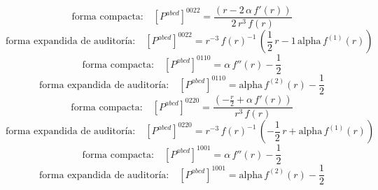 \documentclass[11pt]{article}
\begin{document}
\begin{dmath*}[breakdepth={5}]
\text{forma compacta:}\quad \left[P^{abcd}\right]^{0022} = \frac{\left(r - 2\,\alpha\,f'\!\left(r\right)\right)}{2\,{r}^{3}\,f\!\left(r\right)}
\end{dmath*}
\begin{dmath*}[breakdepth={5}]
\text{forma expandida de auditoría:}\quad \left[P^{abcd}\right]^{0022} = {r}^{-3}\,{f\!\left(r\right)}^{-1}\,\left(\frac{1}{2}\,r - 1\,\mathrm{alpha}\,f^{(1)}\!\left(r\right)\right)
\end{dmath*}
\begin{dmath*}[breakdepth={5}]
\text{forma compacta:}\quad \left[P^{abcd}\right]^{0110} = \alpha\,f''\!\left(r\right) - \frac{1}{2}
\end{dmath*}
\begin{dmath*}[breakdepth={5}]
\text{forma expandida de auditoría:}\quad \left[P^{abcd}\right]^{0110} = \mathrm{alpha}\,f^{(2)}\!\left(r\right) - \frac{1}{2}
\end{dmath*}
\begin{dmath*}[breakdepth={5}]
\text{forma compacta:}\quad \left[P^{abcd}\right]^{0220} = \frac{\left(-\frac{r}{2} + \alpha\,f'\!\left(r\right)\right)}{{r}^{3}\,f\!\left(r\right)}
\end{dmath*}
\begin{dmath*}[breakdepth={5}]
\text{forma expandida de auditoría:}\quad \left[P^{abcd}\right]^{0220} = {r}^{-3}\,{f\!\left(r\right)}^{-1}\,\left(-\frac{1}{2}\,r + \mathrm{alpha}\,f^{(1)}\!\left(r\right)\right)
\end{dmath*}
\begin{dmath*}[breakdepth={5}]
\text{forma compacta:}\quad \left[P^{abcd}\right]^{1001} = \alpha\,f''\!\left(r\right) - \frac{1}{2}
\end{dmath*}
\begin{dmath*}[breakdepth={5}]
\text{forma expandida de auditoría:}\quad \left[P^{abcd}\right]^{1001} = \mathrm{alpha}\,f^{(2)}\!\left(r\right) - \frac{1}{2}
\end{dmath*}
\end{document}
